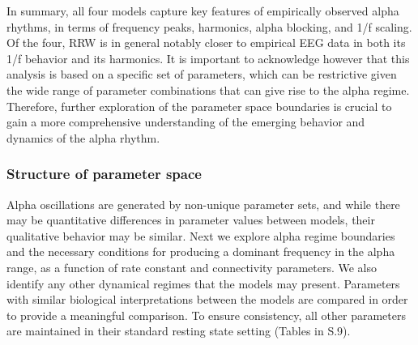 \documentclass[12pt,twoside]{article}
\begin{document}
In summary, all four models capture key features of empirically observed alpha rhythms, in terms of frequency peaks, harmonics, alpha blocking, and 1/f scaling. %
Of the four, RRW is in general notably closer to empirical EEG data in both its 1/f behavior and its harmonics. It is important to acknowledge however that this analysis is based on a specific set of parameters, which can be restrictive given the wide range of parameter combinations that can give rise to the alpha regime. Therefore, further exploration of the parameter space boundaries is crucial to gain a more comprehensive understanding of the emerging behavior and dynamics of the alpha rhythm.  



\vspace{-\baselineskip} 

\vspace{0.5cm}
\subsubsection{Structure of parameter space}
Alpha oscillations are generated by non-unique parameter sets, and while there may be quantitative differences in parameter values between models, their qualitative behavior may be similar. Next we explore alpha regime boundaries and the necessary conditions for producing a dominant frequency in the alpha range, as a function of rate constant and connectivity parameters. We also identify any other dynamical regimes that the models may present. Parameters with similar biological interpretations between the models are compared in order to provide a meaningful comparison.  
To ensure consistency, all other parameters are maintained in their standard resting state setting (Tables in S.9).
\end{document}
